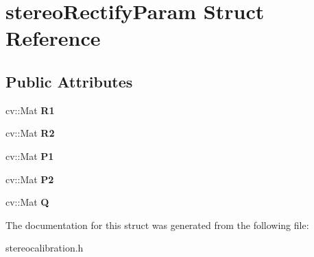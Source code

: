 \hypertarget{structstereo_rectify_param}{}\section{stereo\+Rectify\+Param Struct Reference}
\label{structstereo_rectify_param}
\subsection*{Public Attributes}
\begin{DoxyCompactItemize}
\item 
\mbox{\label{structstereo_rectify_param_a4c8e829e60f0d9e56e9c9e53acaeb82e}} 
cv\+::\+Mat {\bfseries R1}
\item 
\mbox{\label{structstereo_rectify_param_acb68452a9ed6db57cc7ff4b4c8da5650}} 
cv\+::\+Mat {\bfseries R2}
\item 
\mbox{\label{structstereo_rectify_param_a2d64ea1147c3c306615a805766a72495}} 
cv\+::\+Mat {\bfseries P1}
\item 
\mbox{\label{structstereo_rectify_param_a20cfc5663ab3b8febe50ecffa9a83eba}} 
cv\+::\+Mat {\bfseries P2}
\item 
\mbox{\label{structstereo_rectify_param_a059fe466903960f5acfa5f12f9dd067f}} 
cv\+::\+Mat {\bfseries Q}
\end{DoxyCompactItemize}


The documentation for this struct was generated from the following file\+:\begin{DoxyCompactItemize}
\item 
stereocalibration.\+h\end{DoxyCompactItemize}
